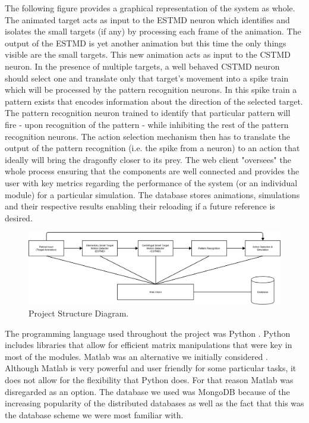\documentclass[a4paper,11pt]{article}
\begin{document}
The following figure provides a graphical representation of the system as whole. The animated target acts as input to the ESTMD neuron which identifies and isolates the small targets (if any) by processing each frame of the animation. The output of the ESTMD is yet another animation but this time the only things visible are the small targets. This new animation acts as input to the CSTMD neuron. In the presence of multiple targets, a well behaved CSTMD neuron should select one and translate only that target's movement into a spike train which will be processed by the pattern recognition neurons. In this spike train a pattern exists that encodes information about the direction of the selected target. The pattern recognition neuron trained to identify that particular pattern will fire - upon recognition of the pattern - while inhibiting the rest of the pattern recognition neurons. The action selection mechanism then has to translate the output of the pattern recognition (i.e. the spike from a neuron) to an action that ideally will bring the dragonfly closer to its prey.
The web client "oversees" the whole process ensuring that the components are well connected and provides the user with key metrics regarding the performance of the system (or an individual module) for a particular simulation. The database stores animations, simulations and their respective results enabling their reloading if a future reference is desired.

\begin{figure}[hb]
\centering
\includegraphics[scale = 0.35]{designblockdiagram2}
\caption{Project Structure Diagram.}
\end{figure}


The programming language used throughout the project was Python \cite{python}. Python includes libraries that allow for efficient matrix manipulations that were key in most of the modules. Matlab was an alternative we initially considered \cite{matlab}. Although Matlab is very powerful and user friendly for some particular tasks, it does not allow for the flexibility that Python does. For that reason Matlab was disregarded as an option.
The database we used was MongoDB because of the increasing popularity of the distributed databases as well as the fact that this was the database scheme we were most familiar with.
\end{document}
